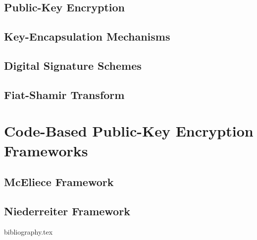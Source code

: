 \documentclass[a4paper,11pt]{article}
\theoremstyle{definition}
\begin{document}
\subsection{Public-Key Encryption}
\subsection{Key-Encapsulation Mechanisms}
\subsection{Digital Signature Schemes}
\subsection{Fiat-Shamir Transform}

\section{Code-Based Public-Key Encryption Frameworks}

\subsection{McEliece Framework}
\subsection{Niederreiter Framework}

{bibliography.tex}
\end{document}
